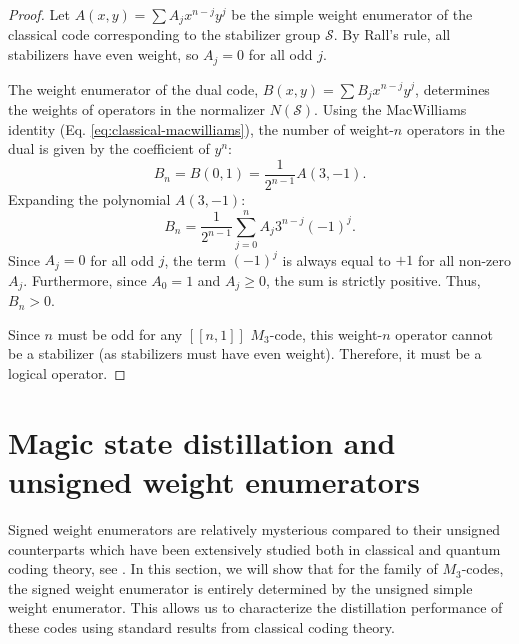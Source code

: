 \documentclass[11pt]{article}
\begin{document}
\begin{proof}
Let $A(x,y) = \sum A_j x^{n-j}y^j$ be the simple weight enumerator of the classical code corresponding to the stabilizer group $\mathcal{S}$. By Rall's rule, all stabilizers have even weight, so $A_j = 0$ for all odd $j$.

The weight enumerator of the dual code, $B(x,y) = \sum B_j x^{n-j}y^j$, determines the weights of operators in the normalizer $N(\mathcal{S})$. Using the MacWilliams identity (Eq. \eqref{eq:classical-macwilliams}), the number of weight-$n$ operators in the dual is given by the coefficient of $y^n$:
\begin{equation}
    B_n = B(0,1) = \frac{1}{2^{n-1}} A(3, -1).
\end{equation}
Expanding the polynomial $A(3, -1)$:
\begin{equation}
    B_n = \frac{1}{2^{n-1}} \sum_{j=0}^n A_j 3^{n-j} (-1)^j.
\end{equation}
Since $A_j = 0$ for all odd $j$, the term $(-1)^j$ is always equal to $+1$ for all non-zero $A_j$. Furthermore, since $A_0=1$ and $A_j \geq 0$, the sum is strictly positive. Thus, $B_n > 0$.

Since $n$ must be odd for any $[[n,1]]$ $M_3$-code, this weight-$n$ operator cannot be a stabilizer (as stabilizers must have even weight). Therefore, it must be a logical operator.
\end{proof}



\section{Magic state distillation and unsigned weight enumerators}
\label{sec:signed-from-simple}
Signed weight enumerators are relatively mysterious compared to their unsigned counterparts which have been extensively studied both in classical and quantum coding theory, see \cite{nebe2006self,rains2002self, shor1997quantum, rains1998quantum,rains1999quantum,rains2000polynomial}. In this section, we will show that for the family of $M_3$-codes, the signed weight enumerator is entirely determined by the unsigned simple weight enumerator. This allows us to characterize the distillation performance of these codes using standard results from classical coding theory.
\end{document}
